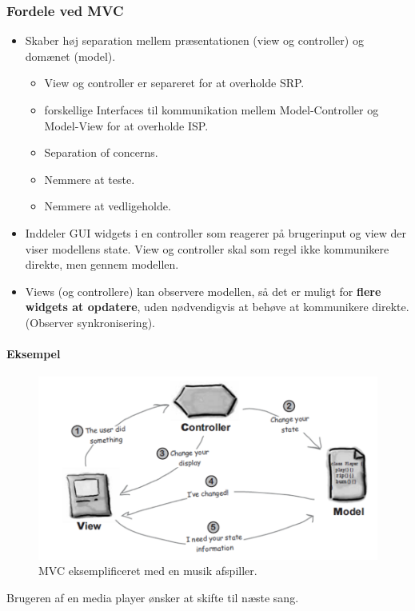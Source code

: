 \subsubsection{Fordele ved MVC}
\begin{itemize}
	\item Skaber høj separation mellem præsentationen (view og controller) og domænet (model).
	\begin{itemize}
		\item View og controller er separeret for at overholde SRP.
		\item forskellige Interfaces til kommunikation mellem Model-Controller og Model-View for at overholde ISP.
		\item Separation of concerns.
		\item Nemmere at teste.
		\item Nemmere at vedligeholde.
	\end{itemize}
	\item Inddeler GUI widgets i en controller som reagerer på brugerinput og view der viser modellens state. View og controller skal som regel ikke kommunikere direkte, men gennem modellen.
	\item Views (og controllere) kan observere modellen, så det er muligt for \textbf{flere widgets at opdatere}, uden nødvendigvis at behøve at kommunikere direkte. (Observer synkronisering).
\end{itemize}

\paragraph{Eksempel}
\begin{figure}[H]
	\centering
	\includegraphics[width=0.8\linewidth]{figs/mvcExample}
	\caption{MVC eksemplificeret med en musik afspiller.}
	\label{fig:mvcExample}
\end{figure}

Brugeren af en media player ønsker at skifte til næste sang.

